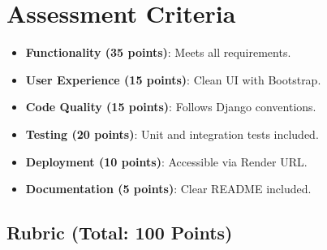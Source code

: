 \documentclass{article}
\begin{document}
\section{Assessment Criteria}
\begin{itemize}
    \item \textbf{Functionality (35 points)}: Meets all requirements.
    \item \textbf{User Experience (15 points)}: Clean UI with Bootstrap.
    \item \textbf{Code Quality (15 points)}: Follows Django conventions.
    \item \textbf{Testing (20 points)}: Unit and integration tests included.
    \item \textbf{Deployment (10 points)}: Accessible via Render URL.
    \item \textbf{Documentation (5 points)}: Clear README included.
\end{itemize}
\newpage 
\subsection{Rubric (Total: 100 Points)}
\end{document}
